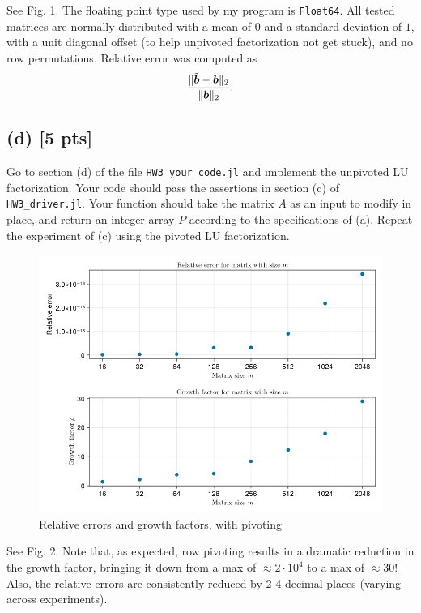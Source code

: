 \documentclass[twoside,10pt]{article}
\begin{document}
\quad See Fig. 1.
The floating point type used by my program is \verb|Float64|.
All tested matrices are normally distributed with a mean of $0$ and a standard deviation of $1$, with a unit diagonal offset (to help unpivoted factorization not get stuck), and no row permutations.
Relative error was computed as
$$\dfrac{\|\tilde{\bm{b}}-\bm{b}\|_2}{\|\bm{b}\|_2}.$$

\subsection*{(d) [5 pts]}
Go to section (d) of the file \texttt{HW3\_your\_code.jl} and implement the unpivoted LU factorization. 
Your code should pass the assertions in section (c) of \texttt{HW3\_driver.jl}.
Your function should take the matrix $A$ as an input to modify in place, and return an integer array $P$ according to the specifications of (a).
Repeat the experiment of (c) using the pivoted LU factorization. 

\begin{figure}[htb]
  \begin{center}
  \includegraphics[width=120mm]{HW3_code/rel_error_and_growth_pivot.png}
  \end{center}
  \caption{Relative errors and growth factors, with pivoting}
  \label{fig:figure2}
\end{figure}

\quad See Fig. 2.
Note that, as expected, row pivoting results in a dramatic reduction in the growth factor, bringing it down from a max of $\approx2\cdot10^4$ to a max of $\approx 30$!
Also, the relative errors are consistently reduced by 2-4 decimal places (varying across experiments).
\end{document}
